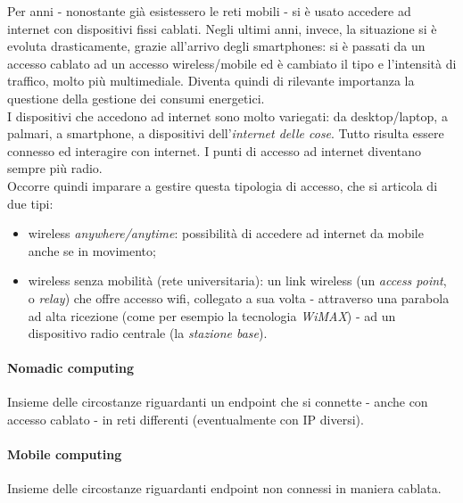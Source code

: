 Per anni - nonostante già esistessero le reti mobili - si è usato accedere ad internet con dispositivi fissi cablati. Negli ultimi anni, invece, la situazione si è evoluta drasticamente, grazie all'arrivo degli smartphones: si è passati da un accesso cablato ad un accesso wireless/mobile ed è cambiato il tipo e l'intensità di traffico, molto più multimediale.
Diventa quindi di rilevante importanza la questione della gestione dei consumi energetici. \\
I dispositivi che accedono ad internet sono molto variegati: da desktop/laptop, a palmari, a smartphone, a dispositivi dell'\textit{internet delle cose}. Tutto risulta essere connesso ed interagire con internet. I punti di accesso ad internet diventano sempre più radio. \\
Occorre quindi imparare a gestire questa tipologia di accesso, che si articola di due tipi:
\begin{itemize}
	\item wireless \textit{anywhere/anytime}: possibilità di accedere ad internet da mobile anche se in movimento;
	\item wireless senza mobilità (rete universitaria): un link wireless (un \textit{access point}, o \textit{relay}) che offre accesso wifi, collegato a sua volta - attraverso una parabola ad alta ricezione (come per esempio la tecnologia \textit{WiMAX}) - ad un dispositivo radio centrale (la \textit{stazione base}).
\end{itemize}

\paragraph{Nomadic computing}
Insieme delle circostanze riguardanti un endpoint che si connette - anche con accesso cablato - in reti differenti (eventualmente con IP diversi).

\paragraph{Mobile computing}
Insieme delle circostanze riguardanti endpoint non connessi in maniera cablata. \\

